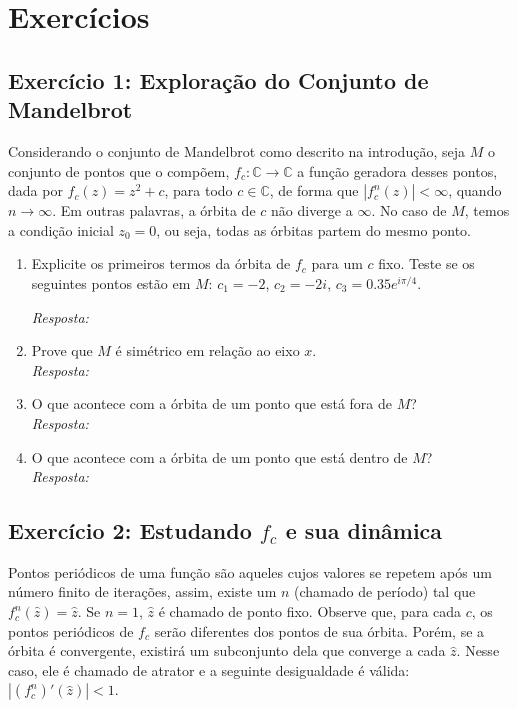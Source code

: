 \section{Exercícios}

\subsection{Exercício 1: Exploração do Conjunto de Mandelbrot}

Considerando o conjunto de Mandelbrot como descrito na introdução, seja \( M \) o
conjunto de pontos que o compõem, \( f_c : \mathbb{C} \to \mathbb{C} \) a função geradora desses pontos, dada por \( f_c (z) = z^2 + c \), para todo
\( c \in \mathbb{C} \), de forma que \( |f_c^n (z)| < \infty \), quando \( n \to \infty \). Em outras palavras, a órbita de \( c \) não diverge a \( \infty \). No caso de
\( M \), temos a condição inicial \( z_0 = 0 \), ou seja, todas as órbitas partem do mesmo ponto.

\begin{enumerate}[label=(\alph*)]
    \item Explicite os primeiros termos da órbita de \( f_c \) para um \( c \) fixo. Teste se os seguintes pontos estão em \( M \): \( c_1 = -2 \), \( c_2 = -2i \), \( c_3 = 0.35 e^{i\pi/4} \).
    
    \textit{Resposta: }

    \item Prove que \( M \) é simétrico em relação ao eixo \( x \). \\
    \textit{Resposta: }

    \item O que acontece com a órbita de um ponto que está fora de \( M \)? \\
    \textit{Resposta: }

    \item O que acontece com a órbita de um ponto que está dentro de \( M \)? \\
    \textit{Resposta: }
\end{enumerate}

\subsection{Exercício 2: Estudando \( f_c \) e sua dinâmica}

Pontos periódicos de uma função são aqueles cujos valores se repetem após um número finito de iterações, assim, existe um \( n \) (chamado de período) tal que \( f_c^n (\hat{z}) = \hat{z} \). Se \( n = 1 \), \( \hat{z} \) é chamado de ponto fixo. Observe que, para cada \( c \), os pontos periódicos de \( f_c \) serão diferentes dos pontos de sua órbita. Porém, se a órbita é convergente, existirá um subconjunto dela que converge a cada \( \hat{z} \). Nesse caso, ele é chamado de atrator e a seguinte desigualdade é válida: \( |(f_c^n)' (\hat{z})| < 1 \).

